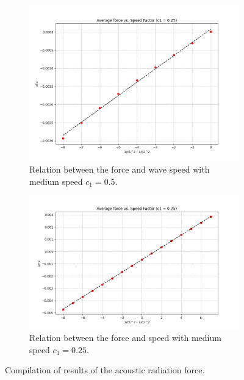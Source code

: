 \begin{figure}
\begin{subfigure}{0.4\textwidth}
    \includegraphics[width=\textwidth]{images/Results/Result_c1_050.png}
    \caption{Relation between the force and wave speed with medium speed $c_1 = 0.5$.}
    \label{fig:wavenumber}
    \end{subfigure}
    \begin{subfigure}{0.4\textwidth}
    \centering
    \includegraphics[width=\textwidth]{images/Results/Result_c025_fixed.png}
    \caption{Relation between the force and speed with medium speed $c_1 = 0.25$.}
    \label{fig:amplitude}
    \end{subfigure}
    \caption{Compilation of results of the acoustic radiation force.}
    \label{fig:ARF_results}
\end{figure}
